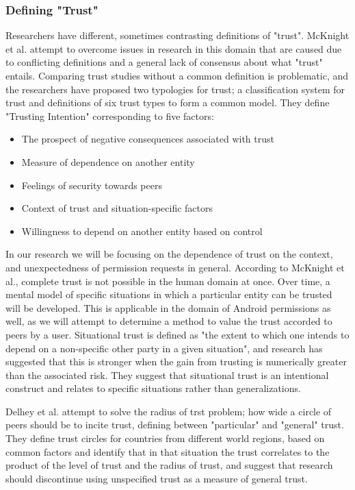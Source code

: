 \subsubsection{Defining "Trust"}
Researchers have different, sometimes contrasting definitions of "trust". McKnight et al. attempt to overcome issues in research in this domain that are caused due to conflicting definitions and a general lack of consensus about what "trust" entails. Comparing trust studies without a common definition is problematic, and the researchers have proposed two typologies for trust; a classification system for trust and definitions of six trust types to form a common model\cite{mcknight1996meanings}. They define "Trusting Intention" corresponding to five factors:
\begin{itemize}
\item The prospect of negative consequences associated with trust
\item Measure of dependence on another entity
\item Feelings of security towards peers 
\item Context of trust and situation-specific factors
\item Willingness to depend on another entity based on control
\end{itemize}
In our research we will be focusing on the dependence of trust on the context, and unexpectedness of permission requests in general. According to McKnight et al., complete trust is not possible in the human domain at once. Over time, a mental model of specific situations in which a particular entity can be trusted will be developed. This is applicable in the domain of Android permissions as well, as we will attempt to determine a method to value the trust accorded to peers by a user. Situational trust is defined as "the extent to which one intends to depend on a non-specific other party in a given situation", and research has suggested that this is stronger when the gain from trusting is numerically greater than the associated risk\cite{kee1970conceptual}. They suggest that situational trust is an intentional construct and relates to specific situations rather than generalizations. 
\smallskip

Delhey et al. attempt to solve the radius of trst problem; how wide a circle of peers should be to incite trust, defining between "particular" and "general" trust\cite{delhey2011general}. They define trust circles for countries from different world regions, based on common factors and identify that in that situation the trust correlates to the product of the level of trust and the radius of trust, and suggest that research should discontinue using unspecified trust as a measure of general trust.

